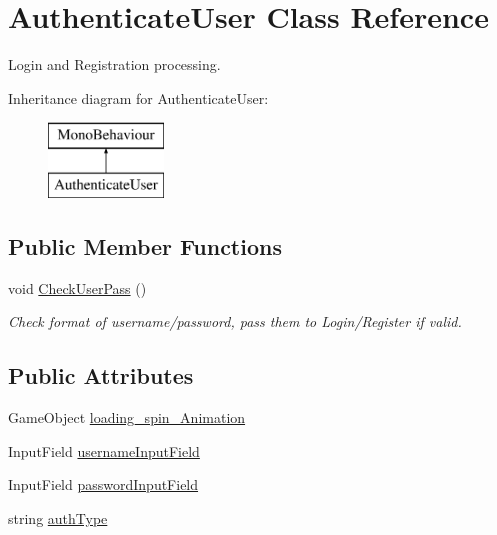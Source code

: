 \hypertarget{class_authenticate_user}{}\section{Authenticate\+User Class Reference}
\label{class_authenticate_user}


Login and Registration processing.  


Inheritance diagram for Authenticate\+User\+:\begin{figure}[H]
\begin{center}
\leavevmode
\includegraphics[height=2.000000cm]{class_authenticate_user}
\end{center}
\end{figure}
\subsection*{Public Member Functions}
\begin{DoxyCompactItemize}
\item 
void \mbox{\hyperlink{class_authenticate_user_a6d1abb9b546a5fa3016bb6063e3eabaa}{Check\+User\+Pass}} ()
\begin{DoxyCompactList}\small\item\em Check format of username/password, pass them to Login/\+Register if valid. \end{DoxyCompactList}\end{DoxyCompactItemize}
\subsection*{Public Attributes}
\begin{DoxyCompactItemize}
\item 
Game\+Object \mbox{\hyperlink{class_authenticate_user_af6ef34075c6ae8b71ccdadf4db3ab2f5}{loading\+\_\+spin\+\_\+\+Animation}}
\item 
Input\+Field \mbox{\hyperlink{class_authenticate_user_a38f2b4577d8f375bb33d3eab2e669774}{username\+Input\+Field}}
\item 
Input\+Field \mbox{\hyperlink{class_authenticate_user_a5def6ad7e62bddc9a48cffee77c04168}{password\+Input\+Field}}
\item 
string \mbox{\hyperlink{class_authenticate_user_a299b64de03d6461c988a78593365624b}{auth\+Type}}
\end{DoxyCompactItemize}
